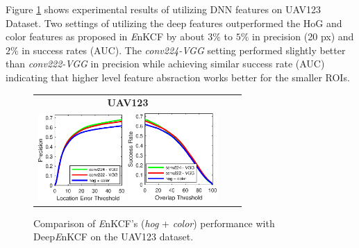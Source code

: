 \documentclass[10pt,twocolumn,letterpaper]{article}
\begin{document}
Figure \ref{fig:UAV123_DATASET_DeepFeatures} shows experimental
results of utilizing DNN features on UAV123 Dataset. Two settings of utilizing the deep
features outperformed the HoG and color features as proposed in {\it
  E}nKCF by about $3\%$ to $5\%$ in precision (20 px) and $2\%$ in
success rates (AUC). The \textit{conv224-VGG} setting performed
slightly better than \textit{conv222-VGG} in precision while achieving
similar success rate (AUC) indicating that higher level feature absraction
works better for the smaller ROIs.
\begin{figure}[!h]
\centering
\begin{tabular}{ccc}
\tiny\quad\quad\textbf{UAV123}\\
\includegraphics[width=3.30cm]{./figures/pr_deep.eps}
\includegraphics[width=3.40cm]{./figures/sr_deep.eps}\\
\end{tabular}
\caption{Comparison of {\it E}nKCF's ({\it hog} + {\it color}) performance with Deep{\it E}nKCF on the UAV123
dataset.}
\label{fig:UAV123_DATASET_DeepFeatures}
\end{figure}

\end{document}
